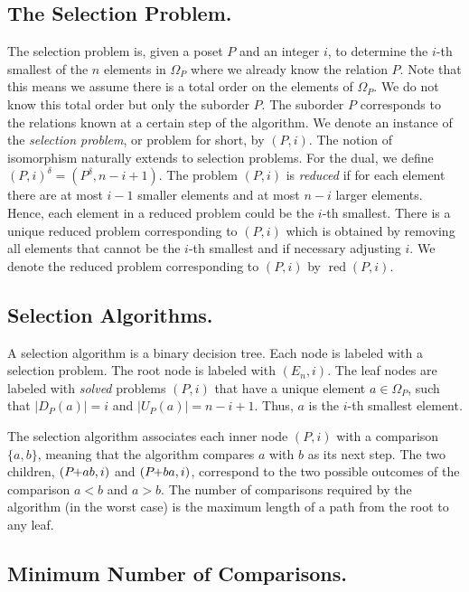 \documentclass[a4paper,UKenglish,cleveref, autoref, thm-restate, anonymous]{lipics-v2021}
\newcommand{\pchild}[3]{{#1}\kern-1pt{+}{#2}{#3}}
\newcommand{\dual}[1]{{#1}^{\delta}}
\newcommand{\reduced}[1]{\operatorname{red}#1}
\newcommand{\less}[2]{D_{#1}(#2)}
\newcommand{\greater}[2]{U_{#1}(#2)}
\begin{document}
\subsection{The Selection Problem.}
The selection problem is, given a poset $P$ and an integer $i$, to determine the $i$-th smallest of the $n$ elements in $\Omega_P$ where we already know the relation $P$.
Note that this means we assume there is a total order on the elements of $\Omega_P$.
We do not know this total order but only the suborder $P$.
The suborder $P$ corresponds to the relations known at a certain step of the algorithm.
We denote an instance of the \emph{selection problem}, or problem for short, by $(P, i)$.
The notion of isomorphism naturally extends to selection problems.
For the dual, we define $\dual{(P, i)} = (\dual{P}, n - i + 1)$.
The problem $(P, i)$ is \emph{reduced} if for each element there are at most $i - 1$ smaller elements and at most $n - i$ larger elements.
Hence, each element in a reduced problem could be the $i$-th smallest.
There is a unique reduced problem corresponding to $(P, i)$ which is obtained by removing all elements that cannot be the $i$-th smallest and if necessary adjusting $i$.
We denote the reduced problem corresponding to $(P, i)$ by $\reduced{(P, i)}$.


\subsection{Selection Algorithms.}
A selection algorithm is a binary decision tree.
Each node is labeled with a selection problem.
The root node is labeled with $(E_n, i)$.
The leaf nodes are labeled with \emph{solved} problems $(P, i)$ that have a unique element $a \in \Omega_P$, such that $|\less{P}{a}| = i$ and $|\greater{P}{a}| = n - i + 1$.
Thus, $a$ is the $i$-th smallest element.

The selection algorithm associates each inner node $(P, i)$ with a comparison $\{a, b\}$, meaning that the algorithm compares $a$ with $b$ as its next step.
The two children, $(\pchild{P}{a}{b}, i)$ and $(\pchild{P}{b}{a}, i)$, correspond to the two possible outcomes of the comparison $a < b$ and $a > b$.
The number of comparisons required by the algorithm (in the worst case) is the maximum length of a path from the root to any leaf.


\subsection{Minimum Number of Comparisons.}
\end{document}
